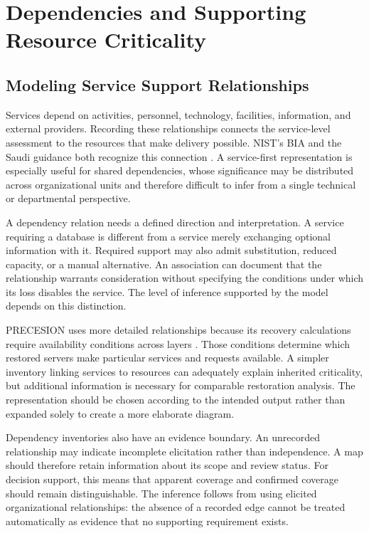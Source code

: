 \section{Dependencies and Supporting Resource Criticality}
\label{sec:lr_dependencies}

\subsection{Modeling Service Support Relationships}
\label{sec:lr_service_dependency}

Services depend on activities, personnel, technology, facilities, information, and external providers. Recording these relationships connects the service-level assessment to the resources that make delivery possible. NIST's BIA and the Saudi guidance both recognize this connection \cite{nist2010contingency,nrcnationalframework,dga2025guidelineen}. A service-first representation is especially useful for shared dependencies, whose significance may be distributed across organizational units and therefore difficult to infer from a single technical or departmental perspective.

A dependency relation needs a defined direction and interpretation. A service requiring a database is different from a service merely exchanging optional information with it. Required support may also admit substitution, reduced capacity, or a manual alternative. An association can document that the relationship warrants consideration without specifying the conditions under which its loss disables the service. The level of inference supported by the model depends on this distinction.

PRECESION uses more detailed relationships because its recovery calculations require availability conditions across layers \cite{elshekeil2017precesion}. Those conditions determine which restored servers make particular services and requests available. A simpler inventory linking services to resources can adequately explain inherited criticality, but additional information is necessary for comparable restoration analysis. The representation should be chosen according to the intended output rather than expanded solely to create a more elaborate diagram.

Dependency inventories also have an evidence boundary. An unrecorded relationship may indicate incomplete elicitation rather than independence. A map should therefore retain information about its scope and review status. For decision support, this means that apparent coverage and confirmed coverage should remain distinguishable. The inference follows from using elicited organizational relationships: the absence of a recorded edge cannot be treated automatically as evidence that no supporting requirement exists.

